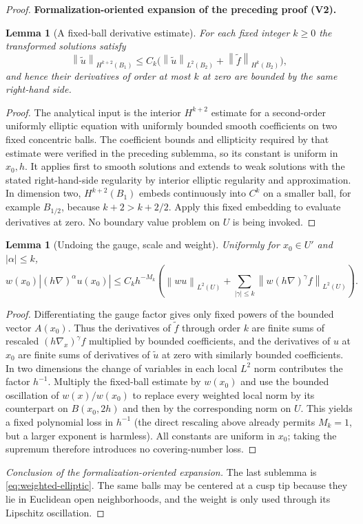 \documentclass[11pt]{article}
\newtheorem{lemma}[theorem]{Lemma}
\newcommand{\formalisationparentid}{X}
\newenvironment{formalisationaddition}[1]{\par\medskip\begingroup\color{blue}\def\formalisationparentid{#1}\setcounter{formalizationsublemma}{0}\let\lemma\formalizationsublemma\let\endlemma\endformalizationsublemma
  \def\Eo{\mathcal E_h^\circ}\def\EE{\mathcal E_h}\def\phio{\phi_h^\circ}\def\phih{\phi_h}\def\Ho{H_h^{\rm atom}(v^\circ)}\def\Ha{H_h^{\rm atom}}\def\HL{H_h^{L}}\def\Dh{D_h}\def\Log{\operatorname{Log}}\def\ellh{\ell_h}\def\Gp{G_{p,h}}\def\Ast{A_{*,h}}\def\ahat{\widehat{\mathfrak a}_h}\def\ah{\mathfrak a_h}\def\rh{\widehat\rho_h}\def\deltah{\widehat\delta_h}\def\oldref##1{\textup{(##1)}}\def\interface##1{\par\noindent\textit{Analytical interface used here.} ##1\par}\def\finish{\par\noindent\textit{Conclusion of the formalization-oriented expansion.} }\par\noindent\textbf{Formalization-oriented expansion of the preceding proof (V2).}\par\smallskip
}{\par\endgroup\medskip
}
\newcommand{\norm}[1]{\left\|#1\right\|}
\begin{document}
\begin{proof}
\begin{formalisationaddition}{LA.3}
\begin{lemma}[A fixed-ball derivative estimate]\label{sublemma:LA-3-interior}
For each fixed integer $k\ge0$ the transformed solutions satisfy
\[
 \norm{\widetilde u}_{H^{k+2}(B_1)}
 \le C_k\bigl(\norm{\widetilde u}_{L^2(B_2)}
             +\norm{\widetilde f}_{H^k(B_2)}\bigr),
\]
and hence their derivatives of order at most $k$ at zero are bounded by the same right-hand side.
\end{lemma}
\begin{proof}
The analytical input is the interior $H^{k+2}$ estimate for a second-order uniformly elliptic equation with uniformly bounded smooth coefficients on two fixed concentric balls. The coefficient bounds and ellipticity required by that estimate were verified in the preceding sublemma, so its constant is uniform in $x_0,h$. It applies first to smooth solutions and extends to weak solutions with the stated right-hand-side regularity by interior elliptic regularity and approximation. In dimension two, $H^{k+2}(B_1)$ embeds continuously into $C^k$ on a smaller ball, for example $B_{1/2}$, because $k+2>k+2/2$. Apply this fixed embedding to evaluate derivatives at zero. No boundary value problem on $U$ is being invoked.
\end{proof}

\begin{lemma}[Undoing the gauge, scale and weight]\label{sublemma:LA-3-weighted-bound}
Uniformly for $x_0\in U'$ and $|\alpha|\le k$,
\[
 w(x_0)|(h\nabla)^\alpha u(x_0)|\le C_kh^{-M_k}
 \left(\norm{wu}_{L^2(U)}+
       \sum_{|\gamma|\le k}\norm{w(h\nabla)^\gamma f}_{L^2(U)}\right).
\]
\end{lemma}
\begin{proof}
Differentiating the gauge factor gives only fixed powers of the bounded vector $A(x_0)$. Thus the derivatives of $\widetilde f$ through order $k$ are finite sums of rescaled $(h\nabla_x)^\gamma f$ multiplied by bounded coefficients, and the derivatives of $u$ at $x_0$ are finite sums of derivatives of $\widetilde u$ at zero with similarly bounded coefficients. In two dimensions the change of variables in each local $L^2$ norm contributes the factor $h^{-1}$. Multiply the fixed-ball estimate by $w(x_0)$ and use the bounded oscillation of $w(x)/w(x_0)$ to replace every weighted local norm by its counterpart on $B(x_0,2h)$ and then by the corresponding norm on $U$. This yields a fixed polynomial loss in $h^{-1}$ (the direct rescaling above already permits $M_k=1$, but a larger exponent is harmless). All constants are uniform in $x_0$; taking the supremum therefore introduces no covering-number loss.
\end{proof}
\finish The last sublemma is \eqref{eq:weighted-elliptic}. The same balls may be centered at a cusp tip because they lie in Euclidean open neighborhoods, and the weight is only used through its Lipschitz oscillation.
\end{formalisationaddition}

\end{proof}
\end{document}
